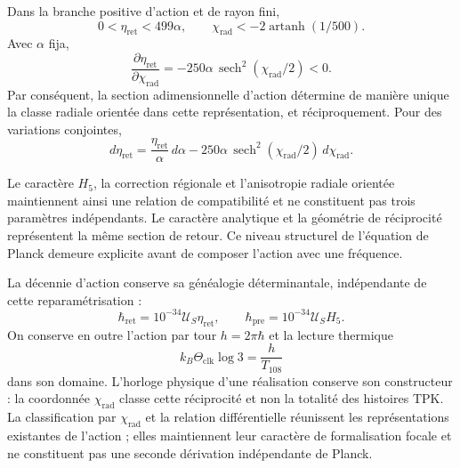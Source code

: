 Dans la branche positive d’action et de rayon fini,
\begin{equation}
 0<\eta_{\mathrm{ret}}<499\alpha,\qquad
 \chi_{\mathrm{rad}}
 <-2\operatorname{artanh}(1/500).
 \label{md:restop:dominio-positivo}
\end{equation}
Avec $\alpha$ fija,
\begin{equation}
 \frac{\partial\eta_{\mathrm{ret}}}{\partial\chi_{\mathrm{rad}}}
 =-250\alpha\,\operatorname{sech}^2(\chi_{\mathrm{rad}}/2)<0.
 \label{md:restop:derivada-accion}
\end{equation}
Par conséquent, la section adimensionnelle d’action détermine de manière unique la
classe radiale orientée dans cette représentation, et réciproquement.
Pour des variations conjointes,
\begin{equation}
 d\eta_{\mathrm{ret}}
 =\frac{\eta_{\mathrm{ret}}}{\alpha}\,d\alpha
 -250\alpha\,\operatorname{sech}^2(\chi_{\mathrm{rad}}/2)
 \,d\chi_{\mathrm{rad}}.
 \label{md:restop:diferencial-accion}
\end{equation}

Le caractère $H_5$, la correction régionale et l’anisotropie radiale orientée
maintiennent ainsi une relation de compatibilité et ne constituent pas trois
paramètres indépendants. Le caractère analytique et la géométrie de
réciprocité représentent la même section de retour.
Ce niveau structurel de l’équation de Planck demeure explicite
avant de composer l’action avec une fréquence.

La décennie d’action conserve sa généalogie déterminantale, indépendante
de cette reparamétrisation :
\begin{equation}
 \hbar_{\mathrm{ret}}
 =10^{-34}\mathcal U_S\eta_{\mathrm{ret}},\qquad
 \hbar_{\mathrm{pre}}=10^{-34}\mathcal U_SH_5.
 \label{md:restop:secciones-accion}
\end{equation}
On conserve en outre l’action par tour $h=2\pi\hbar$ et la lecture
thermique
\begin{equation}
 k_B\Theta_{\mathrm{clk}}\log3=\frac{h}{T_{108}}
 \label{md:restop:lectura-termica}
\end{equation}
dans son domaine. L’horloge physique d’une réalisation conserve son constructeur :
la coordonnée $\chi_{\mathrm{rad}}$ classe cette réciprocité et non la
totalité des histoires TPK. La classification par
$\chi_{\mathrm{rad}}$ et la relation différentielle réunissent les représentations
existantes de l’action ; elles maintiennent leur caractère de formalisation focale et ne
constituent pas une seconde dérivation indépendante de Planck.

